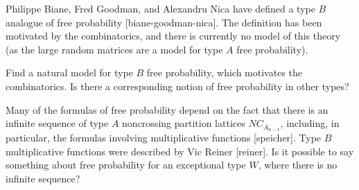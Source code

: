 \documentclass[12pt,letterpaper, reqno]{amsart}
\begin{document}
\begin{problemblock} 
Philippe Biane, Fred Goodman, and Alexandru Nica have defined a type $B$
analogue of free probability [biane-goodman-nica]. The definition
has been motivated by the combinatorics, and there is currently no model
of this theory (as the large random matrices are a model for type $A$
free probability).


\begin{problem}[5.1] 
Find a natural model for type $B$ free probability, which motivates the combinatorics. Is there a corresponding notion of free probability in other types?
\end{problem}

\begin{remark} Many of the formulas of free probability depend on the fact that there is an infinite sequence of type $A$ noncrossing partition lattices $NC_{A_{n-1}}$, including, in particular, the formulas involving multiplicative functions [speicher]. Type $B$ multiplicative functions were described by Vic Reiner [reiner]. Is it possible to say something about free probability for an exceptional type $W$, where there is no infinite sequence?
\end{remark}

\end{problemblock}
\end{document}
